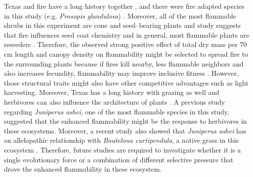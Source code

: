 \documentclass{ttuthes2007}
\begin{document}
\noindent Texas and fire have a long history together \citep{moir1982firehistory, stambaugh2011firehistory,stambaugh2014historicalfirehistory,smeins2005historyoffire1}, and there were fire adapted species in this study (e.g. \emph{Prosopis glandulosa}) \citep{wright1976effect}. %
Moreover, all of the most flammable shrubs in this experiment are cone and seed--bearing plants %
and study suggests that fire influences seed coat chemistry \citep{mcinnes2022doesseedcoatchemistry} and in general, most flammable plants are reseeders \citep{midgley2011pushingreseeders}. Therefore,  the observed strong positive effect of total dry mass per 70\,cm length and canopy density on flammability might be selected to spread fire to the surrounding plants because if fires kill nearby, less flammable neighbors and also increases fecundity, flammability may improve inclusive fitness \citep{bond1995kill}. However, those structural traits might also have other competitive advantages such as light harvesting. Moreover, Texas has a long history with grazing as well and herbivores can also influence the architecture of plants \citep{danell1994browseeffects}. A previous study regarding \emph{Juniperus ashei}, one of the most flammable species in this study, suggested that the enhanced flammability might be the response to herbivores \citep{owens1998seasonal} in these ecosystems. Moreover, a recent study also showed that \emph{Juniperus ashei} has an allelopathic relationship with \emph{Bouteloua curtipendula}, a native grass in this ecosystem \citep{young2009assessmentallelopathy}. Therefore, future studies are required to investigate whether it is a single evolutionary force or a combination of different selective pressure that drove the enhanced flammability in these ecosystem.


\backmatter



\end{document}
